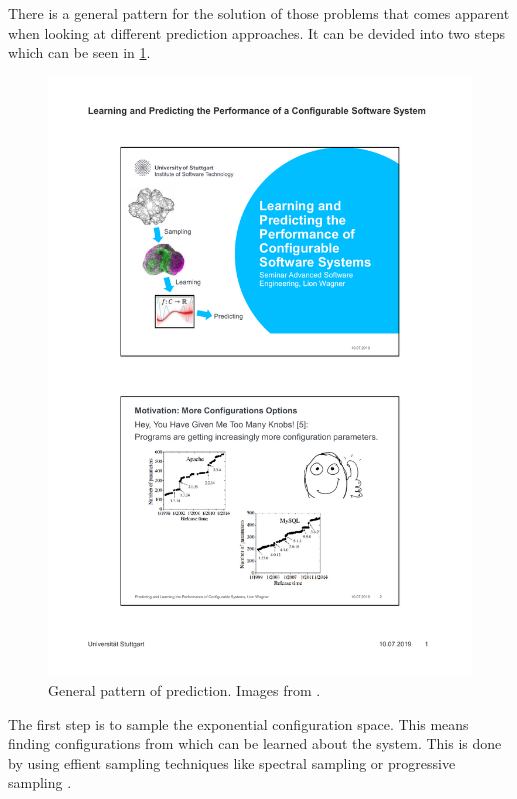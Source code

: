 \noindent
There is a general pattern for the solution of those problems that comes apparent when looking at different prediction approaches. It can be devided into two steps which can be seen in \cref{fig:GeneralApproach}.\begin{figure}
	\includegraphics[page=9,clip,trim=4.1cm 5.9cm 3.9cm 19.4cm, width=\textwidth]{presentation/presentation}
	\caption{General pattern of prediction. Images from \cite{VAMOSConference}.}	\label{fig:GeneralApproach}
\end{figure}

The first step is to sample the exponential configuration space. This means finding configurations from which can be learned about the system. This is done by using effient sampling techniques like spectral sampling \cite{DistanceBasedSampling2019} or progressive sampling \cite{CostEfficientSampling_Gou_Siegmund_2015}.

